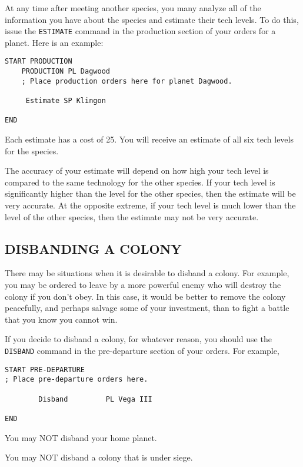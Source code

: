 \documentclass[10pt,titlepage]{article}
\begin{document}
At any time after meeting another species, you many analyze all of the
information you have about the species and estimate their tech levels.  To do
this, issue the \texttt{ESTIMATE} command in the production section of your orders for
a planet.  Here is an example:

\begin{verbatim}
START PRODUCTION
    PRODUCTION PL Dagwood
    ; Place production orders here for planet Dagwood.

     Estimate SP Klingon

END\end{verbatim} 

Each estimate has a cost of 25.  You will receive an estimate of all six tech
levels for the species.

The accuracy of your estimate will depend on how high your tech level is
compared to the same technology for the other species.  If your tech level is
significantly higher than the level for the other species, then the estimate
will be very accurate.  At the opposite extreme, if your tech level is much
lower than the level of the other species, then the estimate may not be very
accurate.


\subsection{DISBANDING A COLONY}
\label{sec:disbandcolony}


There may be situations when it is desirable to disband a colony.  For example,
you may be ordered to leave by a more powerful enemy who will destroy the
colony if you don't obey.  In this case, it would be better to remove the
colony peacefully, and perhaps salvage some of your investment, than to fight
a battle that you know you cannot win.

If you decide to disband a colony, for whatever reason, you should use the
\texttt{DISBAND} command in the pre-departure section of your orders.  For example,

\begin{verbatim}
START PRE-DEPARTURE
; Place pre-departure orders here.

        Disband         PL Vega III

END\end{verbatim} 


\noindent You may NOT disband your home planet.

\noindent You may NOT disband a colony that is under siege.
\end{document}
